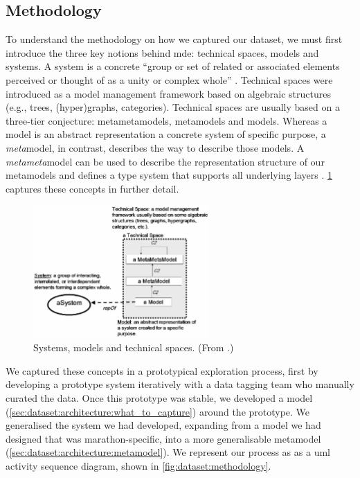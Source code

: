 \subsection{Methodology}
\label{sec:dataset:architecture:methodology}

To understand the methodology on how we captured our dataset, we must first introduce the three key notions behind \gls{mde}: technical spaces, models and systems. A system is a concrete ``group or set of related or associated elements perceived or thought of as a unity or complex whole'' \citep{oed:system}. Technical spaces were introduced \citet{Bezivin:2002} as a model management framework based on algebraic structures (e.g., trees, (hyper)graphs, categories). Technical spaces are usually based on a three-tier conjecture: metametamodels, metamodels and models. Whereas a model is an abstract representation a concrete system of specific purpose, a \textit{meta}model, in contrast, describes the way to describe those models. A \textit{metameta}model can be used to describe the representation structure of our metamodels and defines a type system that supports all underlying layers \citep{Bezivin:2006gw}. \cref{fig:dataset:bezivin2006_metamodel} captures these concepts in further detail.

\begin{figure}[h]
  \centering
  \includegraphics[width=0.6\textwidth]{images/dataset/bezivin2006_metamodel}
  \caption[An overview of systems, models and technical spaces]{Systems, models and technical spaces. (From \citep{Bezivin:2006gw}.)}
  \label{fig:dataset:bezivin2006_metamodel}
\end{figure}

We captured these concepts in a prototypical exploration process, first by developing a prototype system iteratively with a data tagging team who manually curated the data. Once this prototype was stable, we developed a model (\cref{sec:dataset:architecture:what_to_capture}) around the prototype. We generalised the system we had developed, expanding from a model we had designed that was marathon-specific, into a more generalisable metamodel (\cref{sec:dataset:architecture:metamodel}). We represent our process as as a \gls{uml} activity sequence diagram, shown in \cref{fig:dataset:methodology}.


